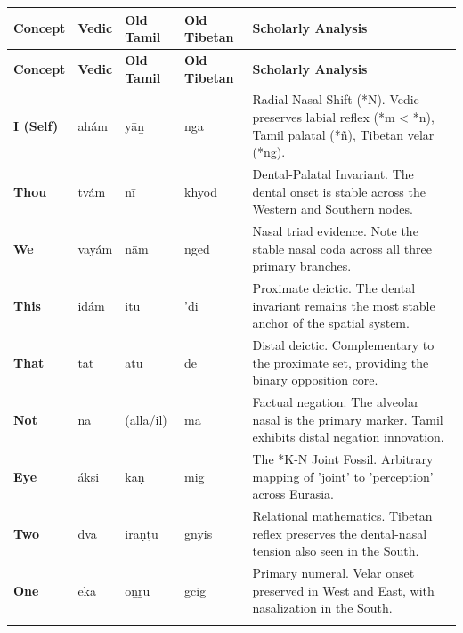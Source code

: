\begin{longtable}{p{} p{} p{} p{} p{}}
\toprule
\textbf{Concept} & \textbf{Vedic} & \textbf{Old Tamil} & \textbf{Old Tibetan} & \textbf{Scholarly Analysis} \\
\midrule
\endfirsthead
\toprule
\textbf{Concept} & \textbf{Vedic} & \textbf{Old Tamil} & \textbf{Old Tibetan} & \textbf{Scholarly Analysis} \\
\midrule
\endhead
\bottomrule
\endfoot

\textbf{I (Self)} & ahám & yāṉ & nga & \small Radial Nasal Shift (*N). Vedic preserves labial reflex (*m < *n), Tamil palatal (*ñ), Tibetan velar (*ng). \\ 
\addlinespace[10pt]

\textbf{Thou} & tvám & nī & khyod & \small Dental-Palatal Invariant. The dental onset is stable across the Western and Southern nodes. \\ 
\addlinespace[10pt]

\textbf{We} & vayám & nām & nged & \small Nasal triad evidence. Note the stable nasal coda across all three primary branches. \\ 
\addlinespace[10pt]

\textbf{This} & idám & itu & 'di & \small Proximate deictic. The dental invariant remains the most stable anchor of the spatial system. \\ 
\addlinespace[10pt]

\textbf{That} & tat & atu & de & \small Distal deictic. Complementary to the proximate set, providing the binary opposition core. \\ 
\addlinespace[10pt]

\textbf{Not} & na & (alla/il) & ma & \small Factual negation. The alveolar nasal is the primary marker. Tamil exhibits distal negation innovation. \\ 
\addlinespace[10pt]

\textbf{Eye} & ákṣi & kaṇ & mig & \small The *K-N Joint Fossil. Arbitrary mapping of 'joint' to 'perception' across Eurasia. \\ 
\addlinespace[10pt]

\textbf{Two} & dva & iraṇṭu & gnyis & \small Relational mathematics. Tibetan reflex preserves the dental-nasal tension also seen in the South. \\ 
\addlinespace[10pt]

\textbf{One} & eka & oṉṟu & gcig & \small Primary numeral. Velar onset preserved in West and East, with nasalization in the South. \\ 
\addlinespace[10pt]


\end{longtable}
